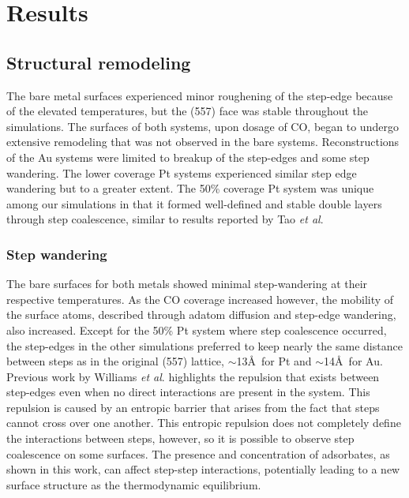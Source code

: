 \documentclass[journal = jpccck, manuscript = article]{achemso}
\begin{document}
%
\section{Results}
\subsection{Structural remodeling}
The bare metal surfaces experienced minor roughening of the step-edge
because of the elevated temperatures, but the (557) face was stable
throughout the simulations. The surfaces of both systems, upon dosage
of CO, began to undergo extensive remodeling that was not observed in
the bare systems. Reconstructions of the Au systems were limited to
breakup of the step-edges and some step wandering. The lower coverage
Pt systems experienced similar step edge wandering but to a greater
extent. The 50\% coverage Pt system was unique among our simulations
in that it formed well-defined and stable double layers through step
coalescence, similar to results reported by Tao {\it et
  al}.\cite{Tao:2010}

\subsubsection{Step wandering}
The bare surfaces for both metals showed minimal step-wandering at
their respective temperatures. As the CO coverage increased however,
the mobility of the surface atoms, described through adatom diffusion
and step-edge wandering, also increased.  Except for the 50\% Pt
system where step coalescence occurred, the step-edges in the other
simulations preferred to keep nearly the same distance between steps
as in the original (557) lattice, $\sim$13\AA~for Pt and
$\sim$14\AA~for Au.  Previous work by Williams {\it et
  al}.\cite{Williams:1991, Williams:1994} highlights the repulsion
that exists between step-edges even when no direct interactions are
present in the system. This repulsion is caused by an entropic barrier
that arises from the fact that steps cannot cross over one
another. This entropic repulsion does not completely define the
interactions between steps, however, so it is possible to observe step
coalescence on some surfaces.\cite{Williams:1991} The presence and
concentration of adsorbates, as shown in this work, can affect
step-step interactions, potentially leading to a new surface structure
as the thermodynamic equilibrium.
\end{document}
